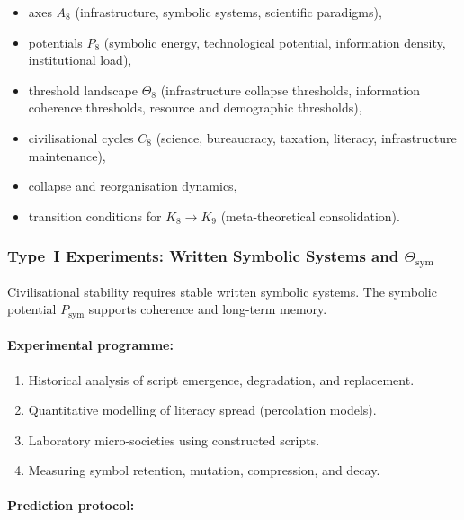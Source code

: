 \begin{itemize}
    \item axes $A_8$ (infrastructure, symbolic systems, scientific paradigms),
    \item potentials $P_8$ (symbolic energy, technological potential,
          information density, institutional load),
    \item threshold landscape $\Theta_8$ (infrastructure collapse thresholds,
          information coherence thresholds, resource and demographic thresholds),
    \item civilisational cycles $C_8$ (science, bureaucracy, taxation,
          literacy, infrastructure maintenance),
    \item collapse and reorganisation dynamics,
    \item transition conditions for $K_8 \to K_9$ (meta-theoretical consolidation).
\end{itemize}



\subsubsection{Type~I Experiments: Written Symbolic Systems and $\Theta_{\mathrm{sym}}$}

Civilisational stability requires stable written symbolic systems.
The symbolic potential $P_{\mathrm{sym}}$ supports coherence and long-term memory.

\paragraph{Experimental programme:}

\begin{enumerate}
    \item Historical analysis of script emergence, degradation, and replacement.
    \item Quantitative modelling of literacy spread (percolation models).
    \item Laboratory micro-societies using constructed scripts.
    \item Measuring symbol retention, mutation, compression, and decay.
\end{enumerate}

\paragraph{Prediction protocol:}

